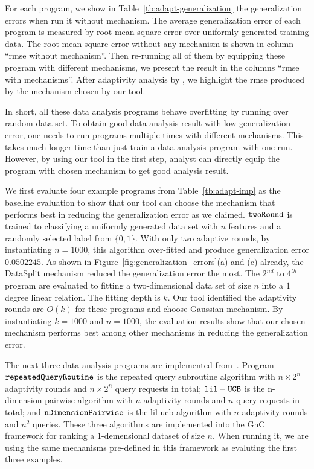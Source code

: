 For each program, we show in Table~\ref{tb:adapt-generalization} the generalization errors when run it without mechanism.
The average generalization error of each program is measured by root-mean-square error over uniformly generated training data.
The root-mean-square error without any mechanism is shown in column ``rmse without mechanism''.
Then re-running all of them by equipping these program with different mechanisms, we present the result
in the columns ``rmse with mechanisms''.
After adaptivity analysis by {\THESYSTEM}, we highlight the rmse produced by the mechanism chosen by our tool.

In short, all these data analysis programs behave overfitting by running over random data set. 
To obtain good data analysis result with low generalization error,
one needs to run programs multiple times with different mechanisms.
This takes much longer time than just train a data analysis program with one run.
However, by using our tool in the first step, analyst can directly equip the program with chosen mechanism to get good
analysis result.


We first evaluate four example programs from Table~\ref{tb:adapt-imp} as the baseline evaluation to show that our tool can choose the mechanism that performs best in reducing the generalization error as we claimed.
$\mathtt{twoRound}$ is trained to classifying a uniformly generated data set with $n$ features and a randomly selected label from $\{0, 1\}$. 
With only two adaptive rounds, by instantiating $n = 1000$, this algorithm over-fitted and produce generalization error 
$0.0502245$. As shown in Figure~\ref{fig:generalization_errors}(a) and (c) already,
the DataSplit mechanism reduced the generalization error the most.
The $2^{nd}$ to $4^{th}$ program are evaluated to fitting a two-dimensional data set of size $n$ into a $1$ degree linear relation.
The fitting depth is $k$.
Our tool identified the adaptivity rounds are $O(k)$ for these programs and choose Gaussian mechanism.
By instantiating $k = 1000$ and $n = 1000$, the evaluation results show that our chosen mechanism performs best among other mechanisms in reducing the generalization error.

The next three data analysis programs are implemented from~\cite{Jamieson2015TheAO}.
Program $\mathtt{repeatedQueryRoutine}$ is the
repeated query subroutine algorithm with $n\times 2^n$ adaptivity rounds and $n\times 2^n$ query requests in total;
$\mathtt{lil-UCB}$ is the n-dimension pairwise algorithm with $n$ adaptivity rounds and $n$ query requests in total;
and $\mathtt{nDimensionPairwise}$ is the lil-ucb algorithm with $n$ adaptivity rounds and $n^2$ queries.
These three algorithms are implemented into the GnC~\cite{BassilyNSSSU16} framework for ranking
a $1$-demensional dataset of size $n$.
When running it, we are using the same mechanisms pre-defined in this framework as evaluting the first three examples.

